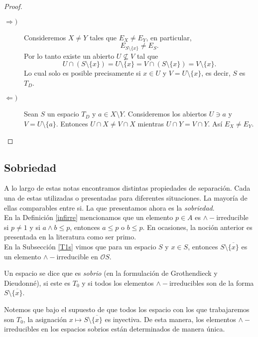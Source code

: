 \documentclass{comunicaciones}
\begin{document}
\begin{proof}
    \begin{description}
        \item[$\Rightarrow )$] Consideremos $X\neq Y$ tales que $E_X\neq E_Y$, en particular, 
        \[
        E_{S\setminus \{x\}}\neq E_S.
        \]
        Por lo tanto existe un abierto $U\nsubseteq V$ tal que 
        \[
        U\cap (S\setminus \{x\})=U\setminus\{x\}=V\cap (S\setminus \{x\})=V\setminus\{x\}.
        \]
        Lo cual solo es posible precisamente si $x\in U$ y $V=U\setminus \{x\}$, es decir, $S$ es $T_D$.
        \item[$\Leftarrow )$] Sean $S$ un espacio $T_D$ y $a\in X\setminus Y$. Consideremos los abiertos $U\ni a$ y $V=U\setminus\{a\}$. Entonces $U\cap X\neq V\cap X$ mientras $U\cap Y=V\cap Y$. Así $E_X\neq E_Y$. 
    \end{description}
\end{proof}

\subsection{Sobriedad}
A lo largo de estas notas encontramos distintas propiedades de separación. Cada una de estas utilizadas o presentadas para diferentes situaciones. La mayoría de ellas comparables entre si. La que presentamos ahora es la \emph{sobriedad}.\\

En la Definición \ref{infirre} mencionamos que un elemento $p\in A$ es $\wedge-$irreducible si $p\neq 1$ y si $a\wedge b\leq p$, entonces $a\leq p$ o $b\leq p$. En ocasiones, la noción anterior es presentada en la literatura como ser primo.\\

En la Subsección \ref{T1s} vimos que para un espacio $S$ y $x\in S$, entonces $S\setminus \overline{\{x\}}$ es un elemento $\wedge-$irreducible en $\mathcal{O}S$.

\begin{dfn}
    Un espacio se dice que es \emph{sobrio} (en la formulación de Grothendieck y Dieudonné), si este es $T_0$ y si todos los elementos $\wedge-$irreducibles son de la forma $S\setminus \overline{\{x\}}$.
\end{dfn}

Notemos que bajo el supuesto de que todos los espacio con los que trabajaremos son $T_0$, la asignación $x\mapsto S\setminus \overline{\{x\}}$ es inyectiva. De esta manera, los elementos $\wedge-$irreducibles en los espacios sobrios están determinados de manera única.
\end{document}

